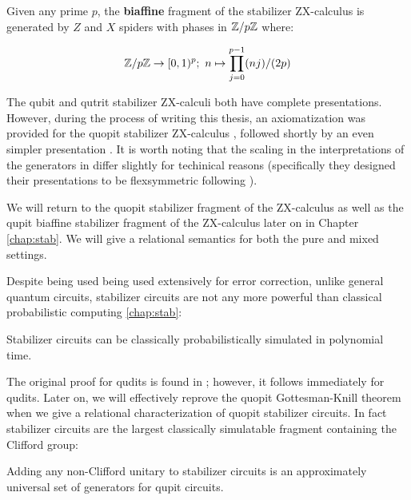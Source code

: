 \begin{definition}
\label{def:biaffine}
Given any prime $p$, the {\bf biaffine} fragment of the stabilizer ZX-calculus is generated by $Z$ and $X$ spiders with phases in $\mathbb{Z}/p\mathbb{Z}$ where:

$$
\mathbb{Z}/p\mathbb{Z} \to [0,1)^p; \ n \mapsto  \prod_{j=0}^{p-1} (n j)/(2p)
$$


\end{definition}



The qubit \cite{backensstab,backens2015} and qutrit \cite{qutrit} stabilizer ZX-calculi both have complete presentations.  However, during the process of writing this thesis, an axiomatization was provided for the quopit stabilizer ZX-calculus \cite{booth}, followed shortly by an even simpler presentation \cite{poor}.  It is worth noting that the scaling in the interpretations of the generators in \cite{poor,booth} differ slightly for techinical reasons (specifically they designed their presentations to be flexsymmetric following \cite[\S 5]{flexsymmetric}).

We will return to the quopit stabilizer fragment of the ZX-calculus as well as the qupit biaffine stabilizer fragment of the ZX-calculus later on in Chapter \ref{chap:stab}.  We will give a relational semantics for both the pure and mixed settings.

Despite being used being used extensively for error correction, unlike general quantum circuits, stabilizer circuits are not any more powerful than classical probabilistic computing \ref{chap:stab}:

\begin{theorem}
Stabilizer circuits can be classically probabilistically  simulated in polynomial time.
\end{theorem}

The original proof for qudits is found in  \cite{gottesmanknill}; however, it follows immediately for qudits.  Later on, we will effectively reprove the quopit Gottesman-Knill theorem when we give a relational characterization of quopit stabilizer circuits.  In fact stabilizer circuits are the largest classically simulatable fragment containing the Clifford group:

\begin{proposition}
\label{prop:campbell}
Adding any non-Clifford unitary to stabilizer circuits is an approximately universal set of generators for qupit  circuits.
\end{proposition}


